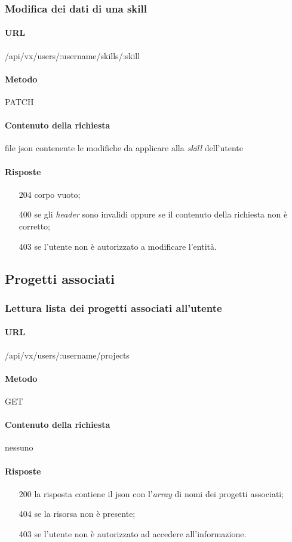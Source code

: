 \subsubsection{Modifica dei dati di una skill}
\paragraph{URL}
/api/vx/users/:username/skills/:skill
\paragraph{Metodo}
PATCH
\paragraph{Contenuto della richiesta}
file \gls{json} contenente le modifiche da applicare alla \emph{skill} dell'utente
\paragraph{Risposte}
\begin{itemize}
	\item[204] corpo vuoto;
	\item[400] se gli \emph{header} sono invalidi oppure se il contenuto della richiesta non è corretto;
	\item[403] se l'utente non è autorizzato a modificare l'entità.
\end{itemize}

\subsection{Progetti associati}

\subsubsection{Lettura lista dei progetti associati all'utente}
\paragraph{URL}
/api/vx/users/:username/projects
\paragraph{Metodo}
GET
\paragraph{Contenuto della richiesta}
nessuno
\paragraph{Risposte}
\begin{itemize}
	\item[200] la risposta contiene il \gls{json} con l'\emph{array} di nomi dei progetti associati;
	\item[404] se la risorsa non è presente;
	\item[403] se l'utente non è autorizzato ad accedere all'informazione.
\end{itemize}

